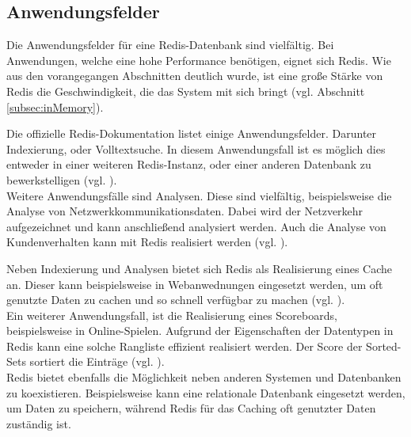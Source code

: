 
\subsection{Anwendungsfelder}
Die Anwendungsfelder für eine \acs{Redis}-Datenbank sind vielfältig. Bei Anwendungen, welche eine hohe Performance benötigen, eignet sich \acs{Redis}. Wie aus den vorangegangen Abschnitten deutlich wurde, ist eine große Stärke von \acs{Redis} die Geschwindigkeit, die das System mit sich bringt (vgl. Abschnitt \ref{subsec:inMemory}).

Die offizielle \acs{Redis}-Dokumentation listet einige Anwendungsfelder. Darunter Indexierung, oder Volltextsuche. In diesem Anwendungsfall ist es möglich dies entweder in einer weiteren \acs{Redis}-Instanz, oder einer anderen Datenbank zu bewerkstelligen (vgl. \cite{Redis-Docs-Anwen}).
\\Weitere Anwendungsfälle sind Analysen. Diese sind vielfältig, beispielsweise die Analyse von Netzwerkkommunikationsdaten. Dabei wird der Netzverkehr aufgezeichnet und kann anschließend analysiert werden. Auch die Analyse von Kundenverhalten kann mit \acs{Redis} realisiert werden (vgl. \cite{Redis-Docs-Anwen}).

Neben Indexierung und Analysen bietet sich \acs{Redis} als Realisierung eines Cache an. Dieser kann beispielsweise in Webanwednungen eingesetzt werden, um oft genutzte Daten zu cachen und so schnell verfügbar zu machen (vgl. \cite{Redis-Docs-cache}).
\\
Ein weiterer Anwendungsfall, ist die Realisierung eines Scoreboards, beispielsweise in Online-Spielen. Aufgrund der Eigenschaften der Datentypen in \acs{Redis} kann eine solche Rangliste effizient realisiert werden. Der Score der Sorted-Sets sortiert die Einträge \newline(vgl. \cite{Redis-Docs-leaderboard}).
\\
\acs{Redis} bietet ebenfalls die Möglichkeit neben anderen Systemen und Datenbanken zu koexistieren. Beispielsweise kann eine relationale Datenbank eingesetzt werden, um Daten zu speichern, während \acs{Redis} für das Caching oft genutzter Daten zuständig ist.
